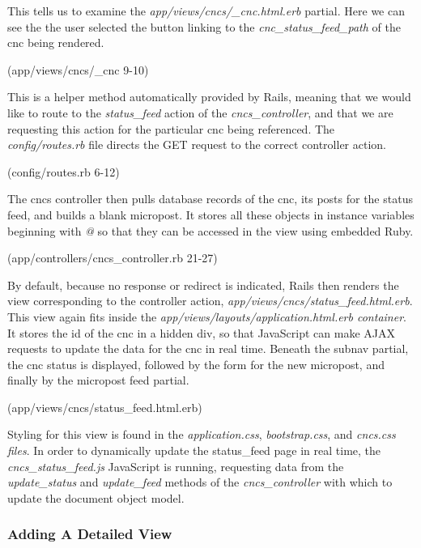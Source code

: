 \documentclass[12pt,letterpaper,titlepage]{article}
\begin{document}
This tells us to examine the \textit{app/views/cncs/\_cnc.html.erb} partial. Here we can see the the user selected the button linking to the \textit{cnc\_status\_feed\_path} of the cnc being rendered. 

(app/views/cncs/\_cnc 9-10)


This is a helper method automatically provided by Rails, meaning that we would like to route to the \textit{status\_feed} action of the \textit{cncs\_controller}, and that we are requesting this action for the particular cnc being referenced. The \textit{config/routes.rb} file directs the GET request to the correct controller action.

(config/routes.rb 6-12)


The cncs controller then pulls database records of the cnc, its posts for the status feed, and builds a blank micropost. It stores all these objects in instance variables beginning with \textit{@} so that they can be accessed in the view using embedded Ruby.

(app/controllers/cncs\_controller.rb 21-27)


By default, because no response or redirect is indicated, Rails then renders the view corresponding to the controller action, \textit{app/views/cncs/status\_feed.html.erb}. This view again fits inside the \textit{app/views/layouts/application.html.erb container}. It stores the id of the cnc in a hidden div, so that JavaScript can make AJAX requests to update the data for the cnc in real time. Beneath the subnav partial, the cnc status is displayed, followed by the form for the new micropost, and finally by the micropost feed partial.

(app/views/cncs/status\_feed.html.erb)


Styling for this view is found in the \textit{application.css}, \textit{bootstrap.css}, and \textit{cncs.css files}. In order to dynamically update the status\_feed page in real time, the \textit{cncs\_status\_feed.js} JavaScript is running, requesting data from the \textit{update\_status} and \textit{update\_feed} methods of the \textit{cncs\_controller} with which to update the document object model.


\subsubsection{Adding A Detailed View} \label{doc:AddDetailedView}
\end{document}

